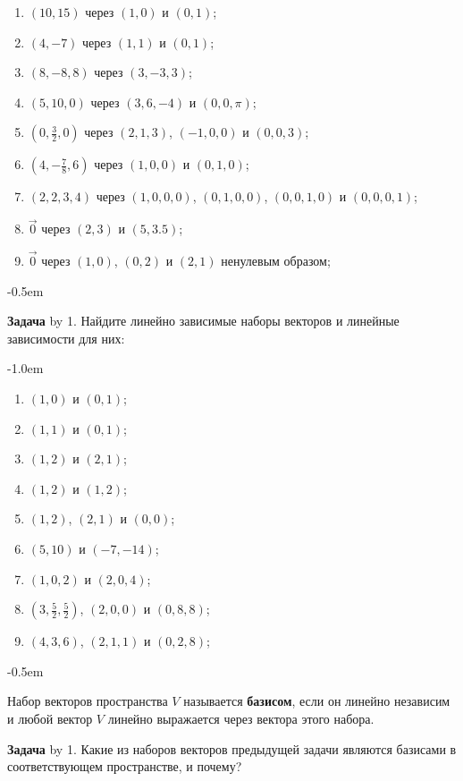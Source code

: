 \documentclass[a4paper,10pt]{article}
\def\problem{\textbf{Задача \the\problemnum}\advance\problemnum by 1}
\begin{document}
{\begin{multicols}{3}
	\begin{enumerate}[label=(\arabic*)\,]
		\item $(10,15)$ через $(1,0)$ и $(0,1)$;
		\item $(4,-7)$ через $(1,1)$ и $(0,1)$;
		\item $(8,-8,8)$ через $(3,-3,3)$;
		\item $(5,10,0)$ через $(3,6,-4)$ и $(0,0,\pi)$;
		\item $(0,\frac32,0)$ через $(2,1,3)$, $(-1,0,0)$ и $(0,0,3)$;
		\item $(4,-\frac78,6)$ через $(1,0,0)$ и $(0,1,0)$;
		\item $(2,2,3,4)$ через $(1,0,0,0)$, $(0,1,0,0)$, $(0,0,1,0)$ и $(0,0,0,1)$;
		\item $\vec0$ через $(2,3)$ и $(5,3.5)$;
		\item $\vec0$ через $(1,0)$, $(0,2)$ и $(2,1)$ ненулевым образом;
	\end{enumerate}
\end{multicols}\par\kern-0.5em

\problem. Найдите линейно зависимые наборы векторов и линейные зависимости для них: \par\kern-1.0em

\begin{multicols}{3}
	\begin{enumerate}[label=(\arabic*)\,]
		\item $(1,0)$ и $(0,1)$;
		\item $(1,1)$ и $(0,1)$;
		\item $(1,2)$ и $(2,1)$;
		\item $(1,2)$ и $(1,2)$;
		\item $(1,2)$, $(2,1)$ и $(0,0)$;
		\item $(5,10)$ и $(-7,-14)$;
		\item $(1,0,2)$ и $(2,0,4)$;
		\item $(3,\frac52,\frac52)$, $(2,0,0)$ и $(0,8,8)$;
		\item $(4,3,6)$, $(2,1,1)$ и $(0,2,8)$;
	\end{enumerate}
\end{multicols}\par\kern-0.5em

Набор векторов пространства $V$ называется \textbf{базисом}, если он линейно независим и любой вектор $V$ линейно выражается через вектора этого набора.

\problem. Какие из наборов векторов предыдущей задачи являются базисами в соответствующем пространстве, и почему?

}
\end{document}
